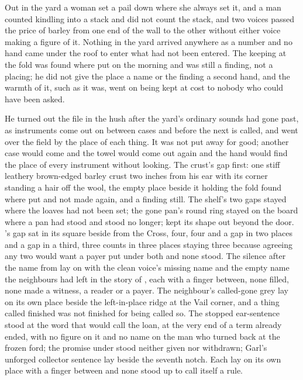 Out in the yard a woman set a pail down where she always set it, and a man counted kindling into a stack and did not count the stack, and two voices passed the price of barley from one end of the wall to the other without either voice making a figure of it. Nothing in the yard arrived anywhere as a number and no hand came under the roof to enter what had not been entered. The keeping at the fold was found where put on the morning and was still a finding, not a placing; he did not give the place a name or the finding a second hand, and the warmth of it, such as it was, went on being kept at cost to nobody who could have been asked.

\scenebreak

He turned out the file in the hush after the yard's ordinary sounds had gone past, as instruments come out on  between cases and before the next is called, and went over the field by the place of each thing. It was not put away for good; another case would come and the towel would come out again and the hand would find the place of every instrument without looking. The crust's gap first: one stiff leathery brown-edged barley crust two inches from his ear with its corner standing a hair off the wool, the empty place beside it holding the fold found where put and not made again, and  a finding still. The shelf's two gaps stayed where the loaves had not been set; the gone pan's round ring stayed on the board where a pan had stood and stood no longer;  kept its shape out beyond the door. 's gap sat in its square beside  from the Cross, four, four and a gap in two places and a gap in a third, three counts in three places staying three because agreeing any two would want a payer put under both and none stood. The silence after the name from  lay on  with the clean voice's missing name and the empty name the neighbours had left in the story of , each with a finger between, none filled, none made a witness, a reader or a payer. The neighbour's called-gone grey lay on its own place beside the left-in-place ridge at the Vail corner, and a thing called finished was not finished for being called so. The stopped ear-sentence stood at the word that would call the loan, at the very end of a term already ended, with no figure on it and no name on the man who turned back at the frozen ford; the promise under  stood neither given nor withdrawn; Garl's unforged collector sentence lay beside the seventh notch. Each lay on its own place with a finger between and none stood up to call itself a rule.

